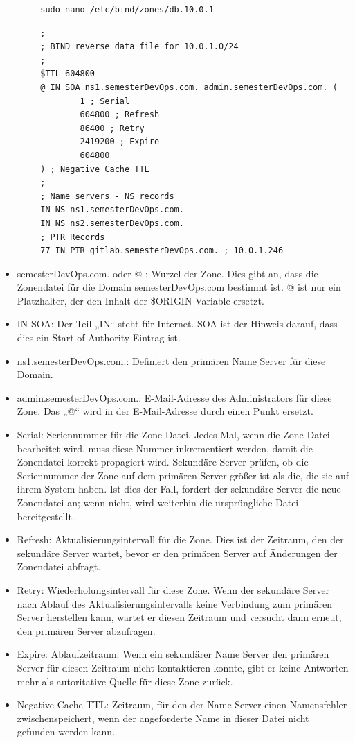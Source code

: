 \documentclass[a4paper,12pt]{article}
\begin{document}
\begin{verbatim}
		sudo nano /etc/bind/zones/db.10.0.1
\end{verbatim}
\begin{verbatim}
		;
		; BIND reverse data file for 10.0.1.0/24
		;
		$TTL 604800
		@ IN SOA ns1.semesterDevOps.com. admin.semesterDevOps.com. (
				1 ; Serial
				604800 ; Refresh
				86400 ; Retry
				2419200 ; Expire
				604800 
		) ; Negative Cache TTL
		;
		; Name servers - NS records
		IN NS ns1.semesterDevOps.com.
		IN NS ns2.semesterDevOps.com.
		; PTR Records
		77 IN PTR gitlab.semesterDevOps.com. ; 10.0.1.246
\end{verbatim}

\begin{itemize}
	\item semesterDevOps.com. oder @ : Wurzel der Zone. Dies gibt an, dass die Zonendatei für die Domain semesterDevOps.com bestimmt ist.
@ ist nur ein Platzhalter, der den Inhalt der \${}ORIGIN-Variable ersetzt.

\item IN SOA: Der Teil „IN“ steht für Internet. SOA ist der Hinweis darauf, dass dies ein Start of Authority-Eintrag ist.

\item ns1.semesterDevOps.com.: Definiert den primären Name Server für diese Domain.

\item admin.semesterDevOps.com.: E-Mail-Adresse des Administrators für diese Zone. Das „@“ wird in der E-Mail-Adresse durch einen Punkt ersetzt.

\item Serial: Seriennummer für die Zone Datei. Jedes Mal, wenn die Zone Datei bearbeitet wird, muss diese Nummer inkrementiert werden, damit die Zonendatei korrekt propagiert wird.
Sekundäre Server prüfen, ob die Seriennummer der Zone auf dem primären Server größer ist als die, die sie auf ihrem System haben. Ist dies der Fall, fordert der sekundäre Server die neue Zonendatei an; wenn nicht, wird weiterhin die ursprüngliche Datei bereitgestellt.

\item Refresh: Aktualisierungsintervall für die Zone. Dies ist der Zeitraum, den der sekundäre Server wartet, bevor er den primären Server auf Änderungen der Zonendatei abfragt.

\item Retry: Wiederholungsintervall für diese Zone. Wenn der sekundäre Server nach Ablauf des Aktualisierungsintervalls keine Verbindung zum primären Server herstellen kann, wartet er diesen Zeitraum und versucht dann erneut, den primären Server abzufragen.

\item Expire: Ablaufzeitraum. Wenn ein sekundärer Name Server den primären Server für diesen Zeitraum nicht kontaktieren konnte, gibt er keine Antworten mehr als autoritative Quelle für diese Zone zurück.

\item Negative Cache TTL: Zeitraum, für den der Name Server einen Namensfehler zwischenspeichert, wenn der angeforderte Name in dieser Datei nicht gefunden werden kann.
\end{itemize}
\end{document}

